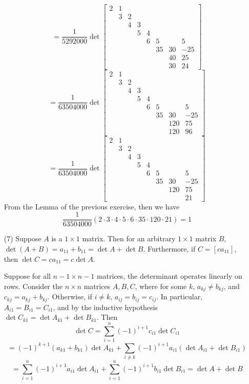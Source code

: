 \documentclass[12pt]{article}
\begin{document}
\begin{itemize}
$$= \frac{1}{5292000}\det\begin{bmatrix}
2 & 1 \\
& 3 & 2 \\
& & 4 & 3 \\
& & & 5 & 4 \\
& & & & 6 & 5 & & 5\\
& & & & & 35 & 30 & -25\\
& & & & & & 40 & 25\\
& & & & & & 30 & 24
\end{bmatrix}$$
$$= \frac{1}{63504000}\det\begin{bmatrix}
2 & 1 \\
& 3 & 2 \\
& & 4 & 3 \\
& & & 5 & 4 \\
& & & & 6 & 5 & & 5\\
& & & & & 35 & 30 & -25\\
& & & & & & 120 & 75\\
& & & & & & 120 & 96
\end{bmatrix}$$
$$= \frac{1}{63504000}\det\begin{bmatrix}
2 & 1 \\
& 3 & 2 \\
& & 4 & 3 \\
& & & 5 & 4 \\
& & & & 6 & 5 & & 5\\
& & & & & 35 & 30 & -25\\
& & & & & & 120 & 75\\
& & & & & & & 21
\end{bmatrix}$$
From the Lemma of the previous exercise, then we have
$$\frac{1}{63504000}(2\cdot 3 \cdot 4 \cdot 5 \cdot 6 \cdot 35 \cdot 120 \cdot 21) = 1$$
\item[(7)]
Suppose $A$ is a $1 \times 1$ matrix. Then for an arbitrary $1 \times 1$ matrix $B$, $\det(A + B) = a_{11} + b_{11} = \det A + \det B$. Furthermore, if $C = [ca_{11}]$, then $\det C = ca_{11} = c\det A$.

Suppose for all $n - 1 \times n - 1$ matrices, the determinant operates linearly on rows. Consider the $n \times n$ matrices $A, B, C$, where for some $k$, $a_{kj} \neq b_{kj}$, and $c_{kj} = a_{kj} + b_{kj}$. Otherwise, if $i \neq k$, $a_{ij} = b_{ij} = c_{ij}$. In particular, $A_{i1} = B_{i1} = C_{i1}$, and by the inductive hypothesis $\det C_{k1} = \det A_{k1} + \det B_{k1}$. Then
$$\det C = \sum_{i=1}^n (-1)^{i+1}c_{i1}\det C_{i1}$$
$$= (-1)^{k+1}(a_{k1} + b_{k1})\det A_{k1} + \sum_{i \neq k}(-1)^{i+1}a_{i1}(\det A_{i1} + \det B_{i1})$$
$$= \sum_{i=1}^n (-1)^{i+1}a_{i1}\det A_{i1} + \sum_{i=1}^n (-1)^{i+1} b_{i1} \det B_{i1} = \det A + \det B$$


\end{itemize}
\end{document}
